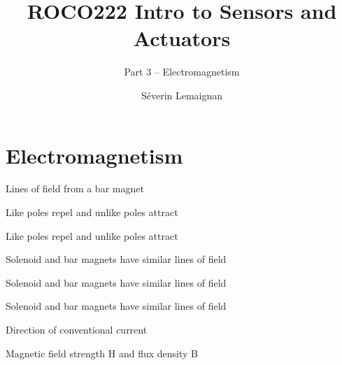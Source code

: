 \documentclass[compress]{beamer}
\title{ROCO222 \newline Intro to Sensors and Actuators}
\subtitle{Part 3 -- Electromagnetism}
\date{}
\author{Séverin Lemaignan}
\institute{Centre for Neural Systems and Robotics\\{\bf Plymouth University}}
\begin{document}

\maketitle

\section{Electromagnetism}

{
    \begin{frame}{Lines of field from a bar magnet}
    \end{frame}
}
{
    \begin{frame}{Like poles repel and unlike poles attract}
    \end{frame}
}

{
    \begin{frame}{Like poles repel and unlike poles attract}
    \end{frame}
}

{
    \begin{frame}{Solenoid and bar magnets have similar lines of field}
    \end{frame}
}

{
    \begin{frame}{Solenoid and bar magnets have similar lines of field}
    \end{frame}
}

{
    \begin{frame}{Solenoid and bar magnets have similar lines of field}
    \end{frame}
}

{
    \begin{frame}{Direction of conventional current}
    \end{frame}
}

{
    \begin{frame}{Magnetic field strength H and flux density B}
    \end{frame}
}
\end{document}
